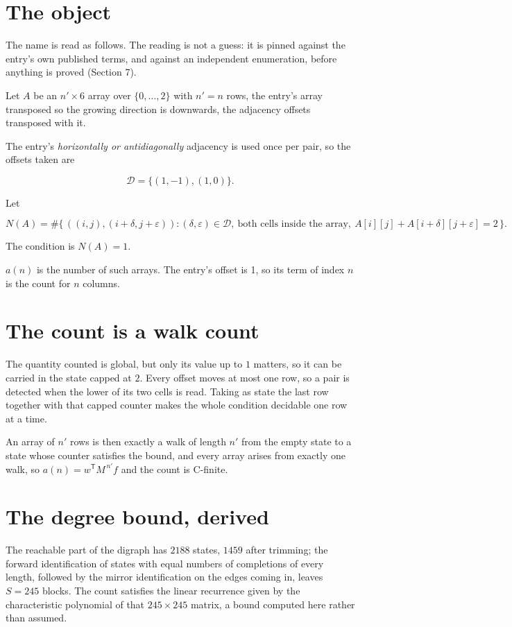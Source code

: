 \documentclass[11pt]{article}
\theoremstyle{definition}
\begin{document}
\section{The object}

The name is read as follows. The reading is not a guess: it is pinned against the entry's own published terms, and against an independent enumeration, before anything is proved (Section 7).

Let $A$ be an $n' \times 6$ array over $\{0,\dots,2\}$ with $n' = n$ rows, the entry's array transposed so the growing direction is downwards, the adjacency offsets transposed with it.

The entry's {\itshape horizontally or antidiagonally} adjacency is used once per pair, so the offsets taken are

\[\mathcal{D} = \{(1,-1), (1,0)\}.\]

Let

\[N(A) = \#\bigl\{\,((i,j),(i{+}\delta,j{+}\varepsilon)) : (\delta,\varepsilon) \in \mathcal{D},\ \text{both cells inside the array},\ A[i][j] + A[i{+}\delta][j{+}\varepsilon] = 2\,\bigr\}.\]

The condition is $N(A) = 1$.

$a(n)$ is the number of such arrays. The entry's offset is 1, so its term of index $n$ is the count for $n$ columns.

\section{The count is a walk count}

The quantity counted is global, but only its value up to $1$ matters, so it can be carried in the state capped at $2$. Every offset moves at most one row, so a pair is detected when the lower of its two cells is read. Taking as state the last row together with that capped counter makes the whole condition decidable one row at a time.

An array of $n'$ rows is then exactly a walk of length $n'$ from the empty state to a state whose counter satisfies the bound, and every array arises from exactly one walk, so $a(n) = w^{\mathsf T}M^{\,n'}f$ and the count is C-finite.

\section{The degree bound, derived}

The reachable part of the digraph has $2188$ states, $1459$ after trimming; the forward identification of states with equal numbers of completions of every length, followed by the mirror identification on the edges coming in, leaves $S = 245$ blocks. The count satisfies the linear recurrence given by the characteristic polynomial of that $245\times245$ matrix, a bound computed here rather than assumed.
\end{document}
